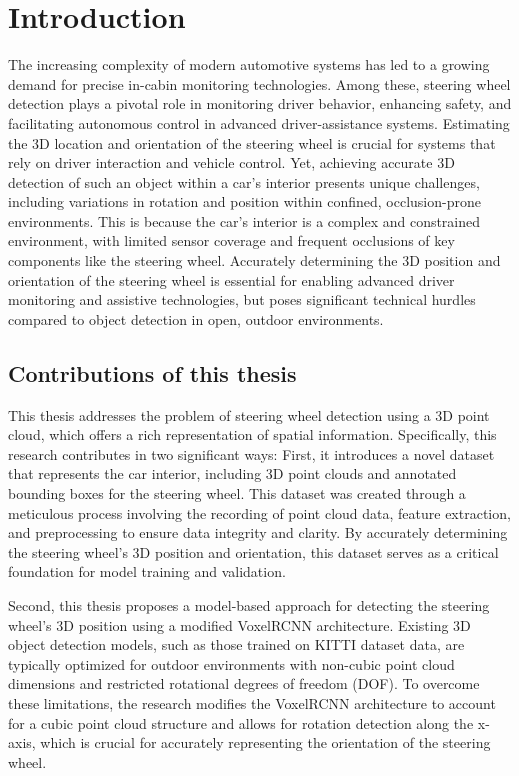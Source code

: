 \chapter{Introduction}


The increasing complexity of modern automotive systems has led to a growing
demand for precise in-cabin monitoring technologies. Among these, 
steering wheel detection plays a pivotal role in monitoring driver
behavior, enhancing safety, and facilitating autonomous control in 
advanced driver-assistance systems. Estimating the 3D location and 
orientation of the steering wheel is crucial for systems that rely on
driver interaction and vehicle control. 
Yet, achieving accurate 3D detection of such an object within a car's 
interior presents unique challenges, including variations in rotation and
position within confined, occlusion-prone environments. This is because 
the car's interior is a complex and constrained environment, with limited 
sensor coverage and frequent occlusions of key components like the 
steering wheel. Accurately determining the 3D position and orientation of 
the steering wheel is essential for enabling advanced driver monitoring 
and assistive technologies, but poses significant technical hurdles 
compared to object detection in open, outdoor environments. 


\section{Contributions of this thesis}
This thesis addresses the problem of steering wheel detection using a 3D 
point cloud, which offers a rich representation of spatial information. 
Specifically, this research contributes in two significant ways: 
First, it introduces a novel dataset that represents the car interior, 
including 3D point clouds and annotated bounding boxes for the steering 
wheel. This dataset was created through a meticulous process involving 
the recording of point cloud data, feature extraction, and preprocessing 
to ensure data integrity and clarity. By accurately determining the 
steering wheel’s 3D position and orientation, this dataset serves as a 
critical foundation for model training and validation.

Second, this thesis proposes a model-based approach for detecting the 
steering wheel’s 3D position using a modified VoxelRCNN architecture. 
Existing 3D object detection models, such as those trained on KITTI 
dataset data, are typically optimized for outdoor environments with 
non-cubic point cloud dimensions and restricted rotational degrees of 
freedom (DOF). To overcome these limitations, the research modifies the VoxelRCNN 
architecture to account for a cubic point cloud structure and allows for rotation detection along 
the x-axis, which is crucial for accurately representing the orientation of the steering wheel.

